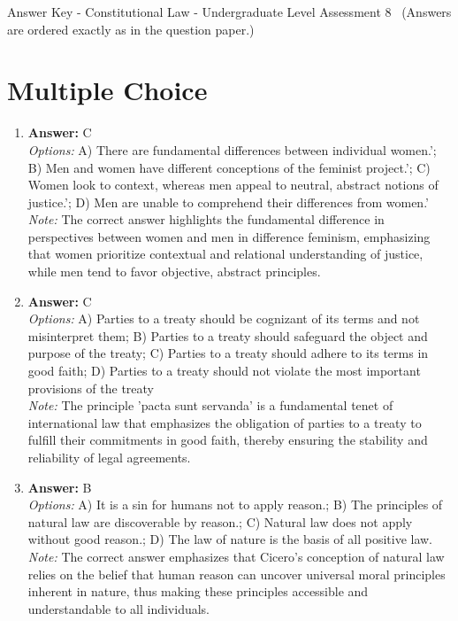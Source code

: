 \documentclass[12pt]{article}
\begin{document}
\begin{center}
Answer Key - Constitutional Law - Undergraduate Level Assessment 8 \
\small (Answers are ordered exactly as in the question paper.)
\end{center}

\section*{Multiple Choice}
\begin{enumerate}[label=\arabic*.]
\item \textbf{Answer:} C
\\ \textit{Options:} A) There are fundamental differences between individual women.'; B) Men and women have different conceptions of the feminist project.'; C) Women look to context, whereas men appeal to neutral, abstract notions of justice.'; D) Men are unable to comprehend their differences from women.'
\\ \textit{Note:} The correct answer highlights the fundamental difference in perspectives between women and men in difference feminism, emphasizing that women prioritize contextual and relational understanding of justice, while men tend to favor objective, abstract principles.
\item \textbf{Answer:} C
\\ \textit{Options:} A) Parties to a treaty should be cognizant of its terms and not misinterpret them; B) Parties to a treaty should safeguard the object and purpose of the treaty; C) Parties to a treaty should adhere to its terms in good faith; D) Parties to a treaty should not violate the most important provisions of the treaty
\\ \textit{Note:} The principle 'pacta sunt servanda' is a fundamental tenet of international law that emphasizes the obligation of parties to a treaty to fulfill their commitments in good faith, thereby ensuring the stability and reliability of legal agreements.
\item \textbf{Answer:} B
\\ \textit{Options:} A) It is a sin for humans not to apply reason.; B) The principles of natural law are discoverable by reason.; C) Natural law does not apply without good reason.; D) The law of nature is the basis of all positive law.
\\ \textit{Note:} The correct answer emphasizes that Cicero's conception of natural law relies on the belief that human reason can uncover universal moral principles inherent in nature, thus making these principles accessible and understandable to all individuals.

\end{enumerate}
\end{document}
